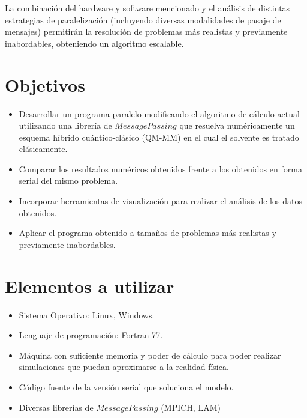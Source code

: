 \documentclass[a4paper, 12pt]{article}
\begin{document}
La combinaci\'on del hardware y software mencionado y el an\'alisis de distintas estrategias de paralelizaci\'on (incluyendo diversas modalidades de pasaje de mensajes) permitir\'an la resoluci\'on de problemas m\'as realistas y previamente inabordables, obteniendo un algoritmo escalable.


\section*{Objetivos}

\begin{itemize}
\item Desarrollar un programa paralelo modificando el algoritmo de c\'alculo actual utilizando una librer\'ia de $Message Passing$ que resuelva num\'ericamente un esquema h\'ibrido cu\'antico-cl\'asico (QM-MM) en el cual el solvente es tratado cl\'asicamente.

\item Comparar los resultados num\'ericos obtenidos frente a los obtenidos en forma serial del mismo problema.

\item Incorporar herramientas de visualizaci\'on para realizar el an\'alisis de los datos obtenidos.

\item Aplicar el programa obtenido a tama\~nos de problemas m\'as realistas y previamente inabordables.
\end{itemize}

\section*{Elementos a utilizar}

\begin{itemize}
\item Sistema Operativo: Linux, Windows.

\item Lenguaje de programaci\'on: Fortran 77.

\item M\'aquina con suficiente memoria y poder de c\'alculo para poder realizar simulaciones que puedan aproximarse a la realidad f\'isica.

\item C\'odigo fuente de la versi\'on serial que soluciona el modelo.

\item Diversas librer\'ias de $Message Passing$ (MPICH, LAM)
\end{itemize}
\end{document}
